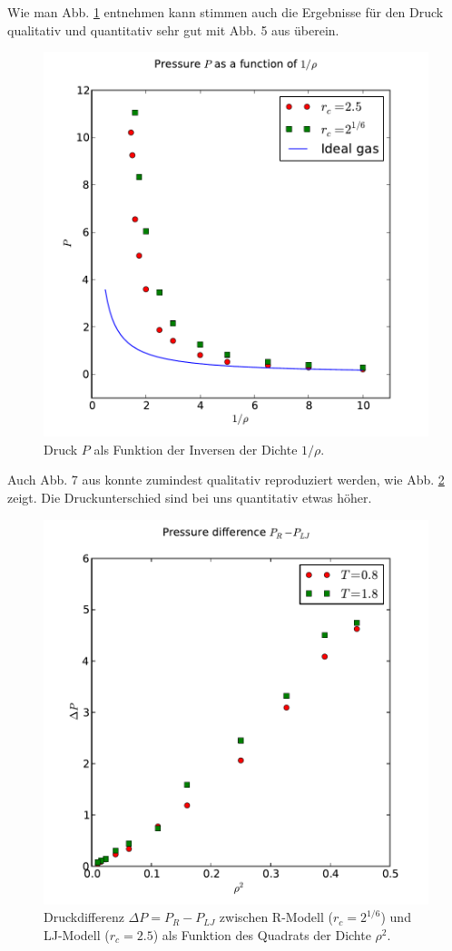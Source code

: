 \documentclass[11pt,a4paper]{article}
\begin{document}
Wie man Abb. \ref{fig:p_rho} entnehmen kann stimmen auch die Ergebnisse für den Druck qualitativ und quantitativ sehr gut mit Abb. 5 aus \cite{sperandeo} überein.
\begin{figure}[tbp]
 \centering
  \includegraphics[width=12cm]{../p_rho_T18}
 \caption{Druck $P$ als Funktion der Inversen der Dichte $1/\rho$.}\label{fig:p_rho}
\end{figure}


Auch Abb. 7 aus \cite{sperandeo} konnte zumindest qualitativ reproduziert werden, wie Abb. \ref{fig:vdw} zeigt. Die Druckunterschied sind bei uns quantitativ etwas höher.
\begin{figure}[tbp]
 \centering
  \includegraphics[width=12cm]{../vdw}
 \caption{Druckdifferenz $\Delta P = P_R - P_{LJ}$ zwischen R-Modell ($r_c = 2^{1/6}$) und LJ-Modell ($r_c = 2.5$) als Funktion des Quadrats der Dichte $\rho^2$.}\label{fig:vdw}
\end{figure}
\end{document}
